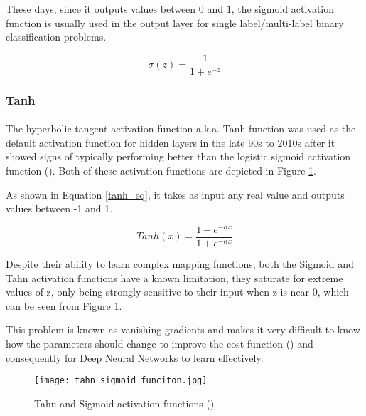 These days, since it outputs values between $0$ and $1$, the sigmoid activation function is usually used in the output layer for single label/multi-label binary classification problems. 

\begin{equation}
    \label{sigmoid_eq}
    \sigma(z) = \frac{1} {1 + e^{-z}}
\end{equation}


\subsubsection{Tanh}
\paragraph{}
The hyperbolic tangent activation function \gls{a.k.a.} Tanh function was used as the default activation function for hidden layers in the late 90s to 2010s after it showed signs of typically performing better than the logistic sigmoid activation function (\cite{GoodBengCour16}).
Both of these activation functions are depicted in Figure \ref{fig_tahn_sigmoid}.

As shown in Equation \ref{tanh_eq}, it takes as input any real value and outputs values between -1 and 1.

\begin{equation}
    \label{tanh_eq}
    Tanh(x) = \frac{1 - e^{-\alpha x}}{1 + e^{-\alpha x}} 
\end{equation}

Despite their ability to learn complex mapping functions, both the Sigmoid and Tahn activation functions have a known limitation, they saturate for extreme values of z, only being strongly sensitive to their input when z is near 0, which can be seen from Figure \ref{fig_tahn_sigmoid}. 

This problem is known as vanishing gradients and makes it very difficult to know how the parameters should change to improve the cost function (\cite{GoodBengCour16}) and consequently for Deep Neural Networks to learn effectively.

\begin{figure}[hbt!]
    \centering
    \texttt{[image: tahn sigmoid funciton.jpg]}
    \caption{Tahn and Sigmoid activation functions (\cite{tahnfunc})}
    \label{fig_tahn_sigmoid}

\end{figure}

